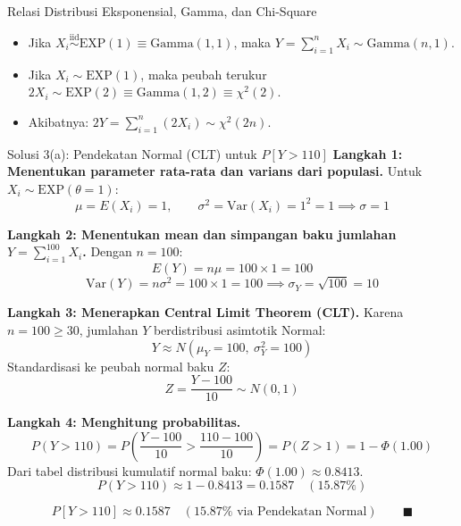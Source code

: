 \documentclass[10pt,twoside]{article}
\begin{document}
\begin{tipbox}{Relasi Distribusi Eksponensial, Gamma, dan Chi-Square}
\begin{itemize}
  \item Jika $X_i \overset{\mathrm{iid}}{\sim} \text{EXP}(1) \equiv \text{Gamma}(1, 1)$, maka $Y = \sum_{i=1}^n X_i \sim \text{Gamma}(n, 1)$.
  \item Jika $X_i \sim \text{EXP}(1)$, maka peubah terukur $2X_i \sim \text{EXP}(2) \equiv \text{Gamma}(1, 2) \equiv \chi^2(2)$.
  \item Akibatnya: $2Y = \sum_{i=1}^n (2X_i) \sim \chi^2(2n)$.
\end{itemize}
\end{tipbox}

\begin{solbox}{Solusi 3(a): Pendekatan Normal (CLT) untuk $P[Y > 110]$}
\textbf{Langkah 1: Menentukan parameter rata-rata dan varians dari populasi.}
Untuk $X_i \sim \text{EXP}(\theta = 1)$:
\[
\mu = E(X_i) = 1, \qquad \sigma^2 = \mathrm{Var}(X_i) = 1^2 = 1 \implies \sigma = 1
\]

\textbf{Langkah 2: Menentukan mean dan simpangan baku jumlahan $Y = \sum_{i=1}^{100} X_i$.}
Dengan $n = 100$:
\[
E(Y) = n\mu = 100 \times 1 = 100
\]
\[
\mathrm{Var}(Y) = n\sigma^2 = 100 \times 1 = 100 \implies \sigma_Y = \sqrt{100} = 10
\]

\textbf{Langkah 3: Menerapkan Central Limit Theorem (CLT).}
Karena $n = 100 \ge 30$, jumlahan $Y$ berdistribusi asimtotik Normal:
\[
Y \approx N(\mu_Y = 100, \ \sigma_Y^2 = 100)
\]
Standardisasi ke peubah normal baku $Z$:
\[
Z = \frac{Y - 100}{10} \sim N(0, 1)
\]

\textbf{Langkah 4: Menghitung probabilitas.}
\[
P(Y > 110) = P\left(\frac{Y - 100}{10} > \frac{110 - 100}{10}\right) = P(Z > 1) = 1 - \Phi(1.00)
\]
Dari tabel distribusi kumulatif normal baku: $\Phi(1.00) \approx 0.8413$.
\[
P(Y > 110) \approx 1 - 0.8413 = 0.1587 \quad (15.87\%)
\]

\[
\boxed{P[Y > 110] \approx 0.1587 \quad (15.87\% \text{ via Pendekatan Normal})} \qquad \blacksquare
\]
\end{solbox}
\end{document}
